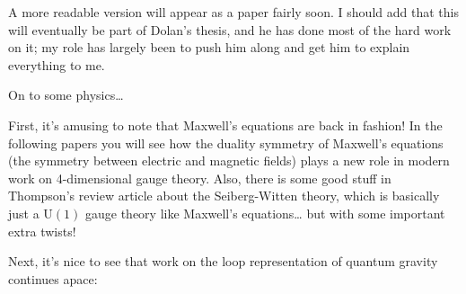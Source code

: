 \documentclass{article}
\def\tightlist{}
\renewcommand{\texttt}[1]{%
  \begingroup
  \ttfamily
  \begingroup\lccode`~=`/\lowercase{\endgroup\def~}{/\discretionary{}{}{}}%
  \begingroup\lccode`~=`[\lowercase{\endgroup\def~}{[\discretionary{}{}{}}%
  \begingroup\lccode`~=`.\lowercase{\endgroup\def~}{.\discretionary{}{}{}}%
  \catcode`/=\active\catcode`[=\active\catcode`.=\active
  \scantokens{#1\noexpand}%
  \endgroup
}
\begin{document}

A more readable version will appear as a paper fairly soon. I should add
that this will eventually be part of Dolan's thesis, and he has done
most of the hard work on it; my role has largely been to push him along
and get him to explain everything to me.

On to some physics\ldots{}

First, it's amusing to note that Maxwell's equations are back in
fashion! In the following papers you will see how the duality symmetry
of Maxwell's equations (the symmetry between electric and magnetic
fields) plays a new role in modern work on 4-dimensional gauge theory.
Also, there is some good stuff in Thompson's review article about the
Seiberg-Witten theory, which is basically just a \(\mathrm{U}(1)\) gauge
theory like Maxwell's equations\ldots{} but with some important extra
twists!


Next, it's nice to see that work on the loop representation of quantum
gravity continues apace:
\end{document}
